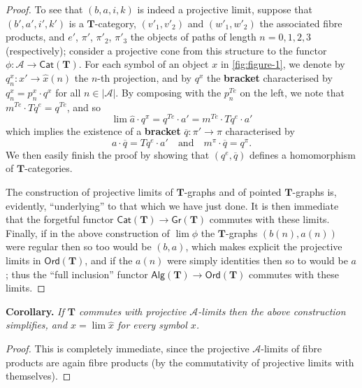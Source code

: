 \documentclass[fleqn]{article}
\newenvironment{itenv}[1]
  {\phantomsection\par\medskip\noindent\textbf{#1.}\itshape}
  {\par\medskip}
\newcommand{\oldpage}[1]{\marginpar{\footnotesize$\Big\vert$ \textit{p.~#1}}}
\newcommand{\unsure}[1]{{\color{purple}\textbf{#1}}}
\newcommand{\TT}{\mathbf{T}}
\newcommand{\textand}{\quad\text{and}\quad}
\newcommand{\cat}[1]{\mathcal{#1}}
\newcommand{\Cat}[1]{\mathsf{#1}}
\newcommand{\set}[1]{|#1|}
\newcommand{\Gr}[1]{\Cat{Gr}(#1)}
\newcommand{\Alg}[1]{\Cat{Alg}(#1)}
\newcommand{\Ord}[1]{\Cat{Ord}(#1)}
\begin{document}
\begin{proof}
  \oldpage{234}
  To see that $(b,a,i,k)$ is indeed a projective limit, suppose that $(b',a',i',k')$ is a $\TT$-category, $(v'_1,v'_2)$ and $(w'_1,w'_2)$ the associated fibre products, and $e'$, $\pi'$, $\pi'_2$, $\pi'_3$ the objects of paths of length $n=0,1,2,3$ (respectively); consider a projective cone from this structure to the functor $\phi\colon\cat{A}\to\Cat{Cat}(\TT)$.
  For each symbol of an object $x$ in \cref{fig:figure-1}, we denote by $q_n^x\colon x'\to\hat{x}(n)$ the $n$-th projection, and by $q^x$ the \unsure{bracket} characterised by $q_n^x=p_n^x\cdot q^x$ for all $n\in\set{\cat{A}}$.
  By composing with the $p_n^{Te}$ on the left, we note that $m^{Te}\cdot Tq^e=q^{Te}$, and so
  \[
    \lim\hat{a}\cdot q^\pi
    = q^{Te}\cdot a'
    = m^{Te}\cdot Tq^e\cdot a'
  \]
  which implies the existence of a \unsure{bracket} $\overline{q}\colon\pi'\to\pi$ characterised by
  \[
    a\cdot\overline{q} = Tq^e\cdot a'
    \textand
    m^\pi\cdot\overline{q} = q^\pi.
  \]
  We then easily finish the proof by showing that $(q^e,\overline{q})$ defines a homomorphism of $\TT$-categories.

  The construction of projective limits of $\TT$-graphs and of pointed $\TT$-graphs is, evidently, ``underlying'' to that which we have just done.
  It is then immediate that the forgetful functor $\Cat{Cat}(\TT)\to\Gr{\TT}$ commutes with these limits.
  Finally, if in the above construction of $\lim\phi$ the $\TT$-graphs $(b(n),a(n))$ were regular then so too would be $(b,a)$, which makes explicit the projective limits in $\Ord{\TT}$, and if the $a(n)$ were simply identities then so to would be $a$;
  thus the ``full inclusion'' functor $\Alg{\TT}\to\Ord{\TT}$ commutes with these limits.
\end{proof}

\begin{itenv}{Corollary}
  If $\TT$ commutes with projective $\cat{A}$-limits then the above construction simplifies, and $x=\lim\hat{x}$ for every symbol $x$.
\end{itenv}

\begin{proof}
  This is completely immediate, since the projective $\cat{A}$-limits of fibre products are again fibre products (by the commutativity of projective limits with themselves).
\end{proof}
\end{document}
